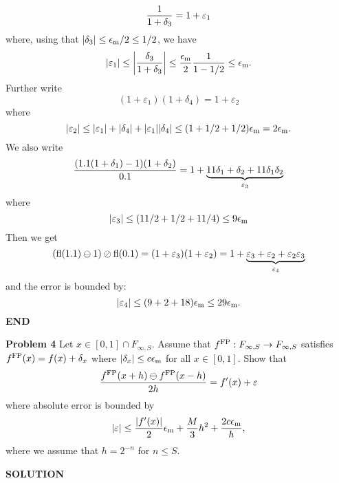 \documentclass[12pt,a4paper]{article}
\begin{document}
\[
{1 \over 1 + \ensuremath{\delta}_3} = 1 + \ensuremath{\varepsilon}_1
\]
where, using that $|\ensuremath{\delta}_3| \ensuremath{\leq} \ensuremath{\epsilon}_{\rm m}/2 \ensuremath{\leq} 1/2$, we have
\[
|\ensuremath{\varepsilon}_1| \ensuremath{\leq} \left| {\ensuremath{\delta}_3 \over 1 + \ensuremath{\delta}_3} \right| \ensuremath{\leq}  {\ensuremath{\epsilon}_{\rm m} \over 2} {1 \over 1 - 1/2} \ensuremath{\leq} \ensuremath{\epsilon}_{\rm m}.
\]
Further write
\[
(1 + \ensuremath{\varepsilon}_1)(1 + \ensuremath{\delta}_4) = 1 + \ensuremath{\varepsilon}_2
\]
where
\[
|\ensuremath{\varepsilon}_2| \ensuremath{\leq} |\ensuremath{\varepsilon}_1| + |\ensuremath{\delta}_4| + |\ensuremath{\varepsilon}_1| |\ensuremath{\delta}_4| \ensuremath{\leq} (1 + 1/2 + 1/2) \ensuremath{\epsilon}_{\rm m} =   2\ensuremath{\epsilon}_{\rm m}.
\]
We also write
\[
{(1.1 (1 + \ensuremath{\delta}_1) - 1)(1 + \ensuremath{\delta}_2) \over 0.1} = 1 + \underbrace{11\ensuremath{\delta}_1 + \ensuremath{\delta}_2 + 11\ensuremath{\delta}_1\ensuremath{\delta}_2}_{\ensuremath{\varepsilon}_3}
\]
where
\[
|\ensuremath{\varepsilon}_3| \ensuremath{\leq} (11/2 + 1/2  + 11/4) \ensuremath{\leq} 9 \ensuremath{\epsilon}_{\rm m}
\]
Then we get
\[
({\rm fl}(1.1) \ensuremath{\ominus} 1) \ensuremath{\oslash} {\rm fl}(0.1) = (1 + \ensuremath{\varepsilon}_3) (1 + \ensuremath{\varepsilon}_2) =  1 + \underbrace{\ensuremath{\varepsilon}_3 + \ensuremath{\varepsilon}_2 + \ensuremath{\varepsilon}_2 \ensuremath{\varepsilon}_3}_{\ensuremath{\varepsilon}_4}
\]
and the error is bounded by:
\[
|\ensuremath{\varepsilon}_4| \ensuremath{\leq} (9 + 2 + 18) \ensuremath{\epsilon}_{\rm m} \ensuremath{\leq} 29 \ensuremath{\epsilon}_{\rm m}.
\]
\textbf{END}

\textbf{Problem 4} Let $x \ensuremath{\in} [0,1] \ensuremath{\cap} F_{\ensuremath{\infty},S}$. Assume that $f^{\rm FP} : F_{\ensuremath{\infty},S} \ensuremath{\rightarrow} F_{\ensuremath{\infty},S}$ satisfies $f^{\rm FP}(x) = f(x) + \ensuremath{\delta}_x$ where $|\ensuremath{\delta}_x| \ensuremath{\leq} c \ensuremath{\epsilon}_{\rm m}$ for all $x \ensuremath{\in} [0,1]$. Show that
\[
{f^{\rm FP}(x+h) \ensuremath{\ominus} f^{\rm FP}(x-h) \over  2h} = f'(x) + \ensuremath{\varepsilon}
\]
where absolute error is bounded by
\[
|\ensuremath{\varepsilon}| \ensuremath{\leq} {|f'(x)| \over 2} \ensuremath{\epsilon}_{\rm m} + {M \over 3} h^2 + {2 c \ensuremath{\epsilon}_{\rm m} \over h},
\]
where we assume  that $h = 2^{-n}$ for $n \ensuremath{\leq} S$.

\textbf{SOLUTION}
\end{document}
